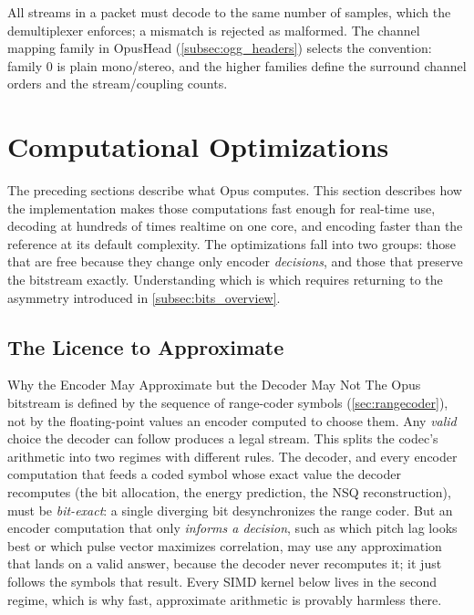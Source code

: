 All streams in a packet must decode to the same number of samples, which the
demultiplexer enforces; a mismatch is rejected as malformed. The channel mapping
family in OpusHead (\cref{subsec:ogg_headers}) selects the convention: family 0
is plain mono/stereo, and the higher families define the surround channel orders
and the stream/coupling counts.

\section{Computational Optimizations}\label{sec:optimizations}

The preceding sections describe what Opus computes. This section describes how
the implementation makes those computations fast enough for real-time use,
decoding at hundreds of times realtime on one core, and encoding faster than the
reference at its default complexity. The optimizations fall into two groups:
those that are free because they change only encoder \emph{decisions}, and those
that preserve the bitstream exactly. Understanding which is which requires
returning to the asymmetry introduced in \cref{subsec:bits_overview}.

\subsection{The Licence to Approximate}\label{subsec:licence}

\begin{concept}{Why the Encoder May Approximate but the Decoder May Not}
  The Opus bitstream is defined by the sequence of range-coder symbols
  (\cref{sec:rangecoder}), not by the floating-point values an
  encoder computed to
  choose them. Any \emph{valid} choice the decoder can follow produces a legal
  stream. This splits the codec's arithmetic into two regimes with different
  rules. The decoder, and every encoder computation that feeds a coded symbol
  whose exact value the decoder recomputes (the bit allocation, the energy
  prediction, the NSQ reconstruction), must be \emph{bit-exact}: a single
  diverging bit desynchronizes the range coder. But an encoder computation that
  only \emph{informs a decision}, such as which pitch lag looks best or which
  pulse vector maximizes correlation, may use any approximation that lands on a
  valid answer, because the decoder never recomputes it; it just follows the
  symbols that result. Every SIMD kernel below lives in the second regime, which
  is why fast, approximate arithmetic is provably harmless there.
\end{concept}

